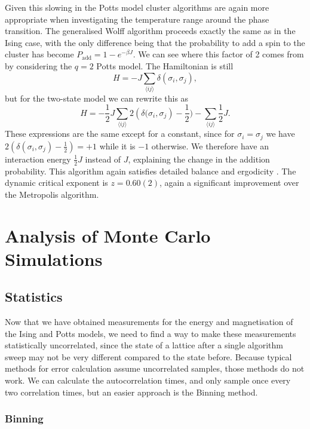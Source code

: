 \documentclass[11pt, a4paper]{report} %
\begin{document}
Given this slowing in the Potts model cluster algorithms are again more appropriate when investigating the temperature range around the phase transition.
The generalised Wolff algorithm proceeds exactly the same as in the Ising case, with the only difference being that the probability to add a spin to the cluster has become \(P_{\mathrm{add}} = 1 - e^{-\beta J}\).
We can see where this factor of 2 comes from by considering the \(q=2\) Potts model.
The Hamiltonian is still
\begin{equation}
	H = -J\sum_{\langle i j \rangle} \delta(\sigma_i, \sigma_j),
\end{equation}
but for the two-state model we can rewrite this as
\begin{equation}
	H = -\frac{1}{2} J \sum_{\langle i j \rangle} 2 \left(\delta(\sigma_i, \sigma_j\right) - \frac{1}{2}) - \sum_{\langle i j \rangle} \frac{1}{2}J.
\end{equation}
These expressions are the same except for a constant, since for \(\sigma_i = \sigma_j\) we have \(2 (\delta(\sigma_i, \sigma_j) - \frac{1}{2}) = +1\) while it is \(-1\) otherwise.
We therefore have an interaction energy \(\frac{1}{2}J\) instead of \(J\), explaining the change in the addition probability.
This algorithm again satisfies detailed balance and ergodicity \cite{newman:1999}.
The dynamic critical exponent is \(z=0.60(2)\), again a significant improvement over the Metropolis algorithm.


\chapter{Analysis of Monte Carlo Simulations}
\section{Statistics}
Now that we have obtained measurements for the energy and magnetisation of the Ising and Potts models, we need to find a way to make these measurements statistically uncorrelated, since the state of a lattice after a single algorithm sweep may not be very different compared to the state before.
Because typical methods for error calculation assume uncorrelated samples, those methods do not work.
We can calculate the autocorrelation times, and only sample once every two correlation times, but an easier approach is the Binning method.

\subsection{Binning}
\end{document}
